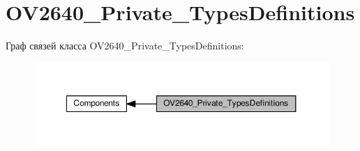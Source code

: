 \hypertarget{group___o_v2640___private___types_definitions}{}\section{O\+V2640\+\_\+\+Private\+\_\+\+Types\+Definitions}
\label{group___o_v2640___private___types_definitions}
Граф связей класса O\+V2640\+\_\+\+Private\+\_\+\+Types\+Definitions\+:
\nopagebreak
\begin{figure}[H]
\begin{center}
\leavevmode
\includegraphics[width=350pt]{group___o_v2640___private___types_definitions}
\end{center}
\end{figure}
